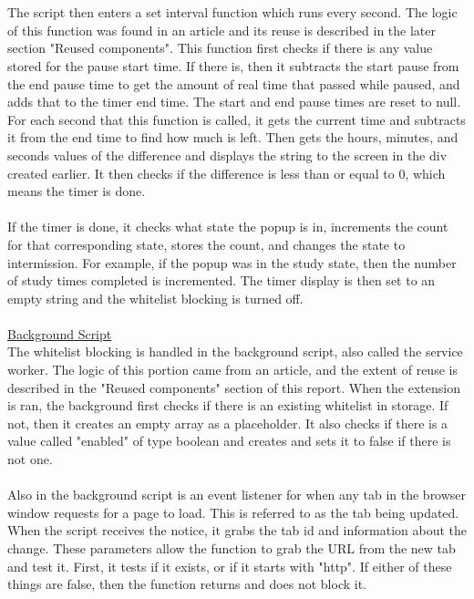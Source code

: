 \documentclass[12pt]{article}
\begin{document}
\\\\The script then enters a set interval function which runs every second. The logic of this function was found in an article and its reuse is described in the later section "Reused components". 
This function first checks if there is any value stored for the pause start time. If there is, 
then it subtracts the start pause from the end pause time to get the amount of real time that passed while paused, and adds that to the timer end time. 
The start and end pause times are reset to null. For each second that this function is called, it gets the current time and subtracts it from the 
end time to find how much is left. Then gets the hours, minutes, and seconds values of the difference and displays the string to the screen in the div created earlier. 
It then checks if the difference is less than or equal to 0, which means the timer is done. 
\\\\If the timer is done, it checks what state the popup is in, increments the count for that corresponding state, stores the count, and changes the state to intermission. 
For example, if the popup was in the study state, then the number of study times completed is incremented. The timer display is then set to an empty string and the whitelist blocking is turned off. 
\\\\
\underline{Background Script}\\
The whitelist blocking is handled in the background script, also called the service worker. The logic of this portion came from an article, and the extent of reuse is described in the "Reused components" section of this report. 
When the extension is ran, the background first checks if there is an existing whitelist in storage. If not, then it creates an empty array as a placeholder. 
It also checks if there is a value called "enabled" of type boolean and creates and sets it to false if there is not one. 
\\\\Also in the background script is an event listener for when any tab in the browser window requests for a page to load. This is referred to as the tab being updated. 
When the script receives the notice, it grabs the tab id and information about the change. These parameters allow the function 
to grab the URL from the new tab and test it. First, it tests if it exists, or if it starts with "http". If either of these things are false, then the function returns and does not block it. 
\end{document}
